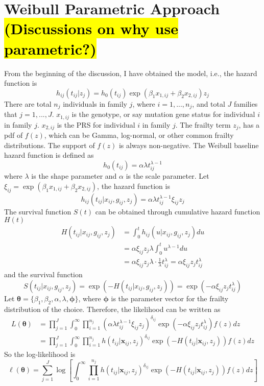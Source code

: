 \documentclass[preprint,12pt]{elsarticle}
\begin{document}
\section{Weibull Parametric Approach \hl{(Discussions on why use parametric?)}}
From the beginning of the discussion, I have obtained the model, i.e., the hazard function is
\begin{equation}
    h_{ij}(t_{ij}|z_j)=h_0(t_{ij})\exp(\beta_1x_{1,ij}+\beta_2 x_{2,ij})z_j
\end{equation}
There are total $n_j$ individuals in family $j$, where $i=1,...,n_j$, and total $J$ families that $j=1,...,J$. $x_{1,ij}$ is the genotype, or say mutation gene status for individual $i$ in family $j$. $x_{2,ij}$
is the PRS for individual $i$ in family $j$. The frailty term $z_j$, has a pdf of $f(z)$, which can be Gamma, log-normal, or other common frailty distributions.
The support of $f(z)$ is always non-negative. The Weibull baseline hazard function is defined as
\begin{equation}
    h_0(t_{ij})=\alpha\lambda t_{ij}^{\lambda-1}
\end{equation}
where $\lambda$ is the shape parameter and $\alpha$ is the scale parameter. Let $\xi_{ij}=\exp(\beta_1 x_{1,ij}+\beta_2 x_{2,ij})$, the hazard function is 
\begin{equation}
    h_{ij}(t_{ij}|x_{ij}, g_{ij}, z_j)=\alpha\lambda t_{ij}^{\lambda-1}\xi_{ij}z_j
\end{equation}
The survival function $S(t)$ can be obtained through cumulative hazard function $H(t)$
\begin{align}
    H(t_{ij}|x_{ij}, g_{ij}, z_j)&=\int_0^{t}h_{ij}(u|x_{ij}, g_{ij}, z_j)du\\
    &=\alpha\xi_{ij}z_j\lambda\int_0^t u^{\lambda-1}du\\
    &=\alpha\xi_{ij}z_j\lambda\cdot \frac{1}{\lambda} t_{ij}^{\lambda}=\alpha\xi_{ij}z_j t_{ij}^{\lambda}
\end{align}
and the survival function
\begin{equation}
    S(t_{ij}|x_{ij}, g_{ij}, z_j)=\exp(-H(t_{ij}|x_{ij}, g_{ij}, z_j))=\exp(-\alpha\xi_{ij}z_j t_{ij}^{\lambda})
\end{equation}
Let $\boldsymbol{\theta}=\{\beta_1, \beta_2, \alpha, \lambda, \boldsymbol{\phi}\}$, where $\boldsymbol{\phi}$ is the parameter vector for the frailty distribution of the choice. Therefore, the likelihood can be written as
\begin{align}
    L(\boldsymbol{\theta})&=\prod_{j=1}^J\int_0^{\infty}\prod_{i=1}^{n_j}(\alpha\lambda t_{ij}^{\lambda-1}\xi_{ij}z_j)^{\delta_{ij}}\exp(-\alpha\xi_{ij}z_j t_{ij}^{\lambda})f(z)dz\\
    &=\prod_{j=1}^J\int_0^{\infty}\prod_{i=1}^{n_j}h(t_{ij}|\mathbf{x}_{ij},z_j)^{\delta_{ij}}\exp(-H(t_{ij}|\mathbf{x}_{ij},z_j))f(z)dz
\end{align}
So the log-likelihood is 
\begin{equation}\label{eq:logllhd}
    \ell(\boldsymbol{\theta})=\sum_{j=1}^J\log \left [ \int_0^{\infty}\prod_{i=1}^{n_j}h(t_{ij}|\mathbf{x}_{ij}, z_j)^{\delta_{ij}}\exp (-H(t_{ij}|\mathbf{x}_{ij}, z_j))f(z)dz\right ]
\end{equation}
\end{document}
